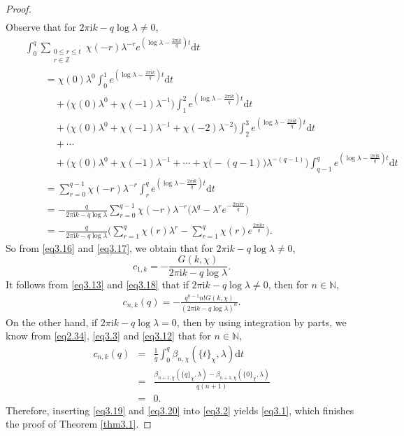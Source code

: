 \documentclass[reqno]{amsart}
\numberwithin{equation}{section}
\begin{document}
\begin{proof}
\begin{eqnarray}
\end{eqnarray}
Observe that for $2\pi\mathrm{i}k-q\log\lambda\neq0$,
\begin{eqnarray}\label{eq3.17}
&&\int_{0}^{q}\underset{\substack{0\leqslant r\leqslant t\\ r\in\mathbb{Z}}}{\sum}\chi(-r)\lambda^{-r}e^{(\log\lambda-\frac{2\pi\mathrm{i}k}{q})t}\text{d}t\nonumber\\
&&\qquad=\chi(0)\lambda^{0}\int_{0}^{1}e^{(\log\lambda-\frac{2\pi\mathrm{i}k}{q})t}\text{d}t\nonumber\\
&&\qquad\quad+\bigl(\chi(0)\lambda^{0}+\chi(-1)\lambda^{-1}\bigl)\int_{1}^{2}e^{(\log\lambda-\frac{2\pi\mathrm{i}k}{q})t}\text{d}t\nonumber\\
&&\qquad\quad+\bigl(\chi(0)\lambda^{0}+\chi(-1)\lambda^{-1}+\chi(-2)\lambda^{-2}\bigl)\int_{2}^{3}e^{(\log\lambda-\frac{2\pi\mathrm{i}k}{q})t}\text{d}t\nonumber\\
&&\qquad\quad+\cdots\nonumber\\
&&\qquad\quad+\bigl(\chi(0)\lambda^{0}+\chi(-1)\lambda^{-1}+\cdots+\chi\bigl(-(q-1)\bigl)\lambda^{-(q-1)}\bigl)\int_{q-1}^{q}e^{(\log\lambda-\frac{2\pi\mathrm{i}k}{q})t}\text{d}t\nonumber\\
&&\qquad=\sum_{r=0}^{q-1}\chi(-r)\lambda^{-r}\int_{r}^{q}e^{(\log\lambda-\frac{2\pi\mathrm{i}k}{q})t}\text{d}t\nonumber\\
&&\qquad=-\frac{q}{2\pi\mathrm{i}k-q\log\lambda}\sum_{r=0}^{q-1}\chi(-r)\lambda^{-r}\bigl(\lambda^{q}-\lambda^{r}e^{-\frac{2\pi\mathrm{i}kr}{q}}\bigl)\nonumber\\
&&\qquad=-\frac{q}{2\pi\mathrm{i}k-q\log\lambda}\biggl(\sum_{r=1}^{q}\chi(r)\lambda^{r}-\sum_{r=1}^{q}\chi(r)e^{\frac{2\pi\mathrm{i}kr}{q}}\biggl).
\end{eqnarray}
So from \eqref{eq3.16} and \eqref{eq3.17}, we obtain that for $2\pi\mathrm{i}k-q\log\lambda\neq0$,
\begin{equation}\label{eq3.18}
c_{1,k}=-\frac{G(k,\chi)}{2\pi\mathrm{i}k-q\log\lambda}.
\end{equation}
It follows from \eqref{eq3.13} and \eqref{eq3.18} that if $2\pi\mathrm{i}k-q\log\lambda\neq0$, then for $n\in\mathbb{N}$,
\begin{eqnarray}\label{eq3.19}
c_{n,k}(q)=-\frac{q^{n-1}n!G(k,\chi)}{(2\pi\mathrm{i}k-q\log\lambda)^{n}}.
\end{eqnarray}
On the other hand, if $2\pi\mathrm{i}k-q\log\lambda=0$, then by using integration by parts, we know from \eqref{eq2.34}, \eqref{eq3.3} and \eqref{eq3.12} that for $n\in\mathbb{N}$,
\begin{eqnarray}\label{eq3.20}
c_{n,k}(q)&=&\frac{1}{q}\int_{0}^{q}\beta_{n,\chi}(\{t\}_{\chi},\lambda)\text{d}t\nonumber\\
&=&\frac{\beta_{n+1,\chi}(\{q\}_{\chi},\lambda)-\beta_{n+1,\chi}(\{0\}_{\chi},\lambda)}{q(n+1)}\nonumber\\
&=&0.
\end{eqnarray}
Therefore, inserting \eqref{eq3.19} and \eqref{eq3.20} into \eqref{eq3.2} yields \eqref{eq3.1}, which finishes the proof of Theorem \ref{thm3.1}.
\end{proof}
\end{document}
